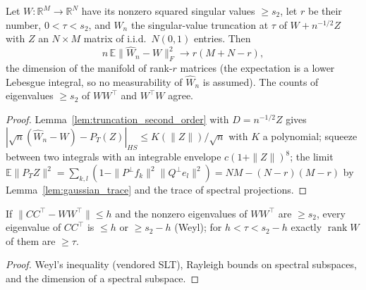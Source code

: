 \begin{theorem}\label{thm:truncation_risk}
\leanok
Let $W:\mathbb R^M\to\mathbb R^N$ have its nonzero squared singular values $\ge s_2$, let
$r$ be their number, $0<\tau<s_2$, and $\widehat W_n$ the singular-value truncation at
$\tau$ of $W+n^{-1/2}Z$ with $Z$ an $N\times M$ matrix of i.i.d.\ $N(0,1)$ entries. Then
\[n\,\mathbb E\|\widehat W_n-W\|_F^2\longrightarrow r(M+N-r),\]
the dimension of the manifold of rank-$r$ matrices (the expectation is a lower Lebesgue
integral, so no measurability of $\widehat W_n$ is assumed). The counts of eigenvalues
$\ge s_2$ of $WW^\top$ and $W^\top W$ agree.
\end{theorem}
\begin{proof}
\leanok
Lemma~\ref{lem:truncation_second_order} with $D=n^{-1/2}Z$ gives
$|\sqrt n(\widehat W_n-W)-P_T(Z)|_{HS}\le K(\|Z\|)/\sqrt n$ with $K$ a polynomial;
squeeze between two integrals with an integrable envelope $c(1+\|Z\|)^8$; the limit
$\mathbb E\|P_TZ\|^2=\sum_{k,l}(1-\|P^\perp f_k\|^2\|Q^\perp e_l\|^2)=NM-(N-r)(M-r)$
by Lemma~\ref{lem:gaussian_trace} and the trace of spectral projections.
\end{proof}

\begin{lemma}\label{lem:truncation_good_event}
\leanok
If $\|CC^\top-WW^\top\|\le h$ and the nonzero eigenvalues of $WW^\top$ are $\ge s_2$, every
eigenvalue of $CC^\top$ is $\le h$ or $\ge s_2-h$ (Weyl); for $h<\tau<s_2-h$ exactly
$\operatorname{rank}W$ of them are $\ge\tau$.
\end{lemma}
\begin{proof}
\leanok
Weyl's inequality (vendored SLT), Rayleigh bounds on spectral subspaces, and the dimension
of a spectral subspace.
\end{proof}

